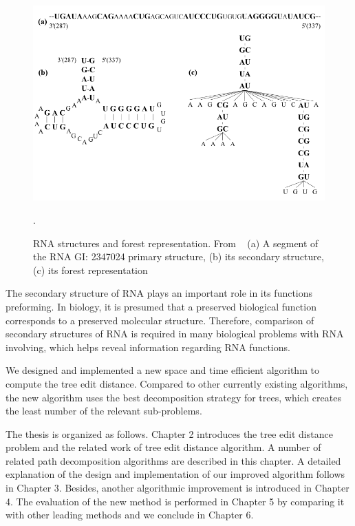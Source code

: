 \begin{figure}
		\centering
		\includegraphics[width=14cm,clip]{Figures/RNATreeRepresentation}
		\label{RNA structures and forest representation} 
		\caption{RNA structures and forest representation. From ~\cite{Liang2012} (a) A segment of the RNA GI: 2347024 primary structure, (b) its secondary structure, (c) its forest representation}. 
\end{figure}

The secondary structure of RNA plays an important role in its functions preforming. In biology, it is presumed that a preserved biological function corresponds to a preserved molecular structure. Therefore, comparison of secondary structures of RNA is required in many biological problems with RNA involving, which helps reveal information regarding RNA functions.

We designed and implemented a new space and time efficient algorithm to compute the tree edit distance. Compared to other currently existing algorithms, the new algorithm uses the best decomposition strategy for trees, which creates the least number of the relevant sub-problems. 

The thesis is organized as follows. Chapter 2 introduces the tree edit distance problem and the related work of tree edit distance algorithm. A number of related path decomposition algorithms are described in this chapter. A detailed explanation of the design and implementation of our improved algorithm follows in Chapter 3. Besides, another algorithmic improvement is introduced in Chapter 4. The evaluation of the new method is performed in Chapter 5 by comparing it with other leading methods and we conclude in Chapter 6.
